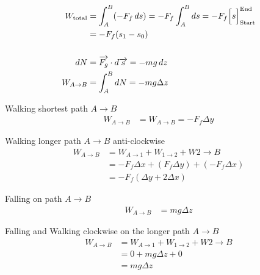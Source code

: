 \documentclass[12pt]{article}
\begin{document}
\begin{align*}
	W_\text{total}                                & = \int_A^B (-F_f \, ds) = - F_f \int_A^B ds = -F_f \Bigl[s\Bigr]_\text{Start}^\text{End}                      \\
	                                              & = -F_f(s_1 - s_0)                                                                                             \\
	\phantom{=}                                                                                                                                                   \\
	dN                                            & = \overrightarrow{F_g} \cdot d \overrightarrow{s} = -mg \, dz                                                 \\
	W_{A \to B}                                   & = \int_A^B dN = -mg \Delta z
\end{align*}

\vspace{2em}

Walking shortest path $A \to B$
\begin{align*}
	W_{A \to B} & = W_{A \to B} = -F_f \Delta y
\end{align*}

Walking longer path $A \to B$ anti-clockwise
\begin{align*}
	W_{A \to B} & = W_{A \to 1} + W_{1 \to 2} + W{2 \to B}           \\
	            & = -F_f \Delta x + (F_f \Delta y) + (-F_f \Delta x) \\
	            & = -F_f (\Delta y + 2 \Delta x)
\end{align*}

Falling on path $A \to B$
\begin{align*}
	W_{A \to B} & = mg \Delta z
\end{align*}

Falling and Walking clockwise on the longer path $A \to B$
\begin{align*}
	W_{A \to B} & = W_{A \to 1} + W_{1 \to 2} + W{2 \to B} \\
	            & = 0 + mg \Delta z + 0                    \\
	            & = mg \Delta z
\end{align*}
\end{document}
